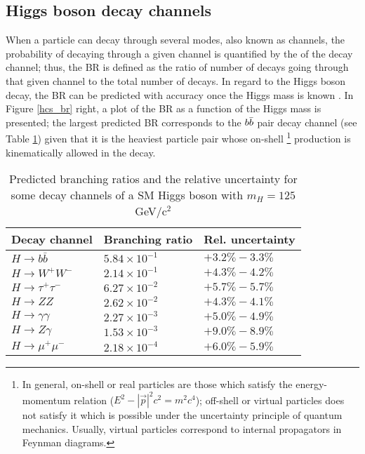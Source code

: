\subsection{Higgs boson decay channels}\label{sec:decays}

When a particle can decay through several modes, also known as channels, the probability of decaying through a given channel is quantified by the  of the decay channel; thus, the BR is defined as the ratio of number of decays going through that given channel to the total number of decays. In regard to the Higgs boson decay, the BR can be predicted with accuracy once the Higgs mass is known \cite{riley, denner}. In Figure \ref{hcs_br} right, a plot of the BR as a function of the Higgs mass is presented; the largest predicted BR corresponds to the $b\bar{b}$ pair decay channel (see Table \ref{hdbr}) given that it is the heaviest particle pair whose on-shell \footnote{In general, on-shell or real particles are those which satisfy the energy-momentum relation ($E^2-|\vec{p}|^2c^2= m^2c^4$); off-shell or virtual particles does not satisfy it which is possible under the uncertainty principle of quantum mechanics. Usually, virtual particles correspond to internal propagators in Feynman diagrams.} production is kinematically allowed in the decay.

\begin{table}[h]
\centering
\small
\begin{tabular}{lll}\hline
Decay channel       & Branching ratio   & Rel. uncertainty\\\hline
$H\to b\bar{b}$     & $5.84\times10^{-1}$ & $+3.2\%-3.3\%$\\
$H\to W^+W^-$       & $2.14\times10^{-1}$ & $+4.3\%-4.2\%$\\
$H\to\tau^+\tau^-$  & $6.27\times10^{-2}$ & $+5.7\%-5.7\%$\\
$H\to ZZ$           & $2.62\times10^{-2}$ & $+4.3\%-4.1\%$\\
$H\to \gamma\gamma$ & $2.27\times10^{-3}$ & $+5.0\%-4.9\%$\\
$H\to Z\gamma$      & $1.53\times10^{-3}$ & $+9.0\%-8.9\%$\\
$H\to\mu^+\mu^-$    & $2.18\times10^{-4}$ & $+6.0\%-5.9\%$\\\hline
\end{tabular}
\caption[Predicted branching ratios for a SM Higgs boson with $m_H = 125$ GeV/c$^2$.]{Predicted branching ratios and the relative uncertainty for some decay channels of a SM Higgs boson with $m_H = 125$ GeV/c$^2$ \cite{pdg}%
}\label{hdbr}
\end{table}


